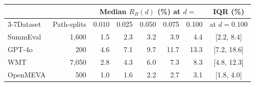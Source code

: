 \begin{tabular}{lrrrrrrc}
\toprule
\multicolumn{2}{c}{} & \multicolumn{5}{c}{Median $R_B(d)$ (\%) at $d=$} & \multicolumn{1}{c}{IQR (\%)} \\
\cmidrule(lr){3-7}Dataset & Path-splits & 0.010 & 0.025 & 0.050 & 0.075 & 0.100 & at $d=0.100$ \\
\midrule
SummEval & 1,600 & 1.5 & 2.3 & 3.2 & 3.9 & 4.4 & [2.2, 8.4] \\
GPT-4o & 200 & 4.6 & 7.1 & 9.7 & 11.7 & 13.3 & [7.2, 18.6] \\
WMT & 7,050 & 2.8 & 4.3 & 6.0 & 7.3 & 8.3 & [4.8, 12.3] \\
OpenMEVA & 500 & 1.0 & 1.6 & 2.2 & 2.7 & 3.1 & [1.8, 4.0] \\
\bottomrule
\end{tabular}
